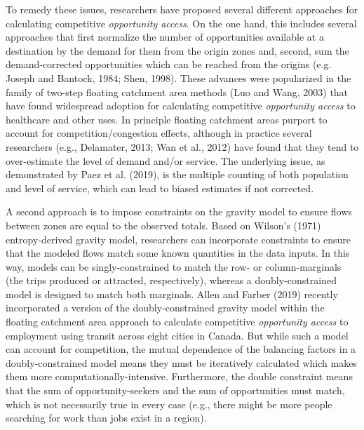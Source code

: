 \documentclass[]{elsarticle} %
\begin{document}
To remedy these issues, researchers have proposed several different
approaches for calculating competitive \emph{opportunity access}. On the
one hand, this includes several approaches that first normalize the
number of opportunities available at a destination by the demand for
them from the origin zones and, second, sum the demand-corrected
opportunities which can be reached from the origins (e.g. Joseph and
Bantock, 1984; Shen, 1998). These advances were popularized in the
family of two-step floating catchment area methods (Luo and Wang, 2003)
that have found widespread adoption for calculating competitive
\emph{opportunity access} to healthcare and other uses. In principle
floating catchment areas purport to account for competition/congestion
effects, although in practice several researchers (e.g., Delamater,
2013; Wan et al., 2012) have found that they tend to over-estimate the
level of demand and/or service. The underlying issue, as demonstrated by
Paez et al. (2019), is the multiple counting of both population and
level of service, which can lead to biased estimates if not corrected.

A second approach is to impose constraints on the gravity model to
ensure flows between zones are equal to the observed totals. Based on
Wilson's (1971) entropy-derived gravity model, researchers can
incorporate constraints to ensure that the modeled flows match some
known quantities in the data inputs. In this way, models can be
singly-constrained to match the row- or column-marginals (the trips
produced or attracted, respectively), whereas a doubly-constrained model
is designed to match both marginals. Allen and Farber (2019) recently
incorporated a version of the doubly-constrained gravity model within
the floating catchment area approach to calculate competitive
\emph{opportunity access} to employment using transit across eight
cities in Canada. But while such a model can account for competition,
the mutual dependence of the balancing factors in a doubly-constrained
model means they must be iteratively calculated which makes them more
computationally-intensive. Furthermore, the double constraint means that
the sum of opportunity-seekers and the sum of opportunities must match,
which is not necessarily true in every case (e.g., there might be more
people searching for work than jobs exist in a region).
\end{document}
